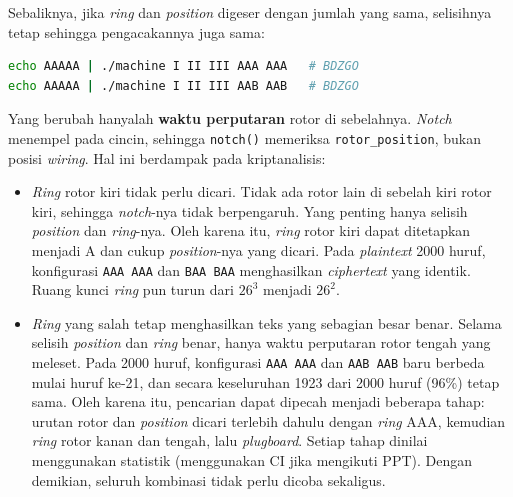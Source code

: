 \begin{enumerate}
  Sebaliknya, jika \textit{ring} dan \textit{position} digeser dengan jumlah yang sama, selisihnya tetap
  sehingga pengacakannya juga sama:
\begin{lstlisting}[language=bash,numbers=none]
echo AAAAA | ./machine I II III AAA AAA   # BDZGO
echo AAAAA | ./machine I II III AAB AAB   # BDZGO
\end{lstlisting}

  Yang berubah hanyalah \textbf{waktu perputaran} rotor di sebelahnya. \textit{Notch} menempel pada
  cincin, sehingga \texttt{notch()} memeriksa \texttt{rotor\_position}, bukan posisi \textit{wiring}. Hal ini
  berdampak pada kriptanalisis:
  \begin{itemize}[nosep]
    \item \textit{Ring} rotor kiri tidak perlu dicari. Tidak ada rotor lain di sebelah kiri
    rotor kiri, sehingga \textit{notch}-nya tidak berpengaruh. Yang penting hanya selisih
    \textit{position} dan \textit{ring}-nya. Oleh karena itu, \textit{ring} rotor kiri dapat ditetapkan
    menjadi A dan cukup \textit{position}-nya yang dicari. Pada \textit{plaintext} 2000 huruf, konfigurasi
    \texttt{AAA AAA} dan \texttt{BAA BAA} menghasilkan \textit{ciphertext} yang identik. Ruang kunci
    \textit{ring} pun turun dari $26^3$ menjadi $26^2$.
    \item \textit{Ring} yang salah tetap menghasilkan teks yang sebagian besar benar. Selama
    selisih \textit{position} dan \textit{ring} benar, hanya waktu perputaran rotor tengah yang meleset.
    Pada 2000 huruf, konfigurasi \texttt{AAA AAA} dan \texttt{AAB AAB} baru berbeda mulai huruf ke-21,
    dan secara keseluruhan 1923 dari 2000 huruf (96\%) tetap sama. Oleh karena itu, pencarian dapat
    dipecah menjadi beberapa tahap: urutan rotor dan \textit{position} dicari terlebih dahulu dengan
    \textit{ring} AAA, kemudian \textit{ring} rotor kanan dan tengah, lalu \textit{plugboard}. Setiap
    tahap dinilai menggunakan statistik (menggunakan CI jika mengikuti PPT). Dengan demikian, seluruh kombinasi
    tidak perlu dicoba sekaligus.
  \end{itemize}


\end{enumerate}

